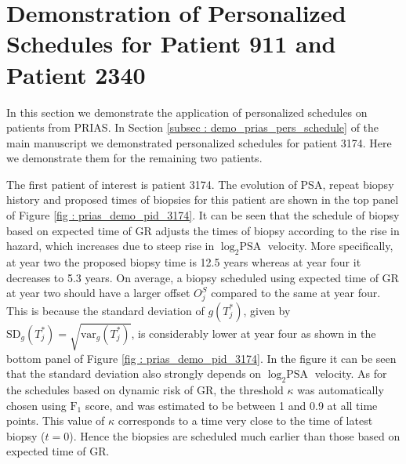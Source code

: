 
\section{Demonstration of Personalized Schedules for Patient 911 and Patient 2340}
\label{sec : demo_911_2340}

In this section we demonstrate the application of personalized schedules on patients from PRIAS. In Section \ref{subsec : demo_prias_pers_schedule} of the main manuscript we demonstrated personalized schedules for patient 3174. Here we demonstrate them for the remaining two patients.


The first patient of interest is patient 3174. The evolution of PSA, repeat biopsy history and proposed times of biopsies for this patient are shown in the top panel of Figure \ref{fig : prias_demo_pid_3174}. It can be seen that the schedule of biopsy based on expected time of GR adjusts the times of biopsy according to the rise in hazard, which increases due to steep rise in $\log_2 \mbox{PSA}$ velocity. More specifically, at year two the proposed biopsy time is 12.5 years whereas at year four it decreases to 5.3 years. On average, a biopsy scheduled using expected time of GR at year two should have a larger offset $O^S_j$ compared to the same at year four. This is because the standard deviation of $g(T^*_j)$, given by $\mbox{SD}_g(T^*_j) = \sqrt{\mbox{var}_g(T^*_j)}$, is considerably lower at year four as shown in the bottom panel of Figure \ref{fig : prias_demo_pid_3174}. In the figure it can be seen that the standard deviation also strongly depends on $\log_2 \mbox{PSA}$ velocity. As for the schedules based on dynamic risk of GR, the threshold $\kappa$ was automatically chosen using $\mbox{F}_1$ score, and was estimated to be between 1 and 0.9 at all time points. This value of $\kappa$ corresponds to a time very close to the time of latest biopsy ($t=0$). Hence the biopsies are scheduled much earlier than those based on expected time of GR.

